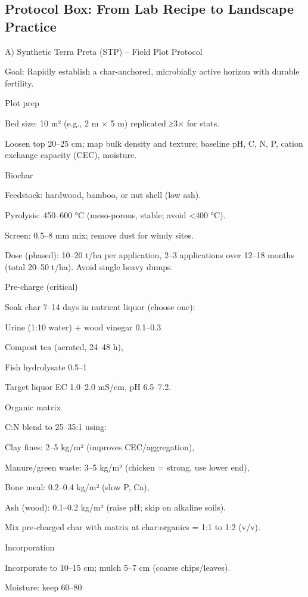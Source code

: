 \documentclass{article}
\begin{document}
\subsection{Protocol Box: From Lab Recipe to Landscape Practice}

A) Synthetic Terra Preta (STP) – Field Plot Protocol

Goal: Rapidly establish a char-anchored, microbially active horizon with durable fertility.

Plot prep

Bed size: 10 m² (e.g., 2 m × 5 m) replicated ≥3× for stats.

Loosen top 20–25 cm; map bulk density and texture; baseline pH, C, N, P, cation exchange capacity (CEC), moisture.


Biochar

Feedstock: hardwood, bamboo, or nut shell (low ash).

Pyrolysis: 450–600 °C (meso-porous, stable; avoid <400 °C).

Screen: 0.5–8 mm mix; remove dust for windy sites.

Dose (phased): 10–20 t/ha per application, 2–3 applications over 12–18 months (total 20–50 t/ha). Avoid single heavy dumps.


Pre-charge (critical)

Soak char 7–14 days in nutrient liquor (choose one):

Urine (1:10 water) + wood vinegar 0.1–0.3%

Compost tea (aerated, 24–48 h),

Fish hydrolysate 0.5–1%


Target liquor EC 1.0–2.0 mS/cm, pH 6.5–7.2.


Organic matrix

C:N blend to 25–35:1 using:

Clay fines: 2–5 kg/m² (improves CEC/aggregation),

Manure/green waste: 3–5 kg/m² (chicken = strong, use lower end),

Bone meal: 0.2–0.4 kg/m² (slow P, Ca),

Ash (wood): 0.1–0.2 kg/m² (raise pH; skip on alkaline soils).


Mix pre-charged char with matrix at char:organics = 1:1 to 1:2 (v/v).


Incorporation

Incorporate to 10–15 cm; mulch 5–7 cm (coarse chips/leaves).

Moisture: keep 60–80%
\end{document}
